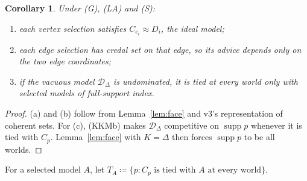 \documentclass[11pt]{article}
\newtheorem{corollary}[theorem]{Corollary}
\theoremstyle{remark}\newtheorem{remark}[theorem]{Remark}
\newcommand{\Dscr}{\mathcal D}
\newcommand{\supp}{\operatorname{supp}}
\begin{document}
\begin{corollary}\label{cor:face}
Under (G), (LA) and (S):
\begin{enumerate}[label=(\alph*)]
\item each vertex selection satisfies $C_{e_i}\approx D_i$, the ideal model;
\item each edge selection has credal set on that edge, so its advice depends
only on the two edge coordinates;
\item if the vacuous model $\Dscr_\Delta$ is undominated, it is tied at every
world only with selected models of full-support index.
\end{enumerate}
\end{corollary}
\begin{proof}
(a) and (b) follow from Lemma~\ref{lem:face} and v3's representation of
coherent sets. For (c), (KKMb) makes $\Dscr_\Delta$ competitive on $\supp p$
whenever it is tied with $C_p$. Lemma~\ref{lem:face} with $K=\Delta$ then
forces $\supp p$ to be all worlds.
\end{proof}

For a selected model $A$, let
$T_A\coloneqq\{p:C_p\text{ is tied with }A\text{ at every world}\}$.
\end{document}
